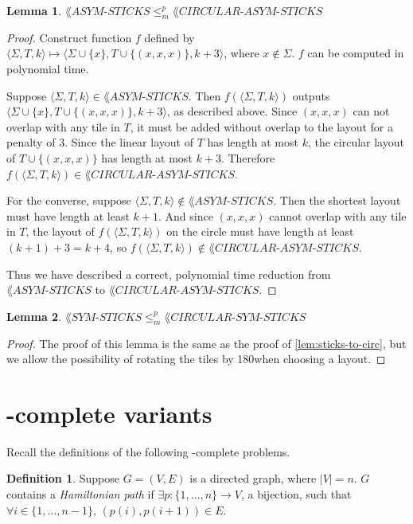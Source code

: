 \documentclass[draft]{article}
\newtheorem{lemma}[lemma]{Lemma}
\theoremstyle{definition} \newtheorem{definition}[definition]{Definition}
\theoremstyle{definition} \newreptheorem{definition}{Definition}
\newcommand{\dash}{\mbox{-}}
\newcommand{\defn}[1]{\emph{#1}}
\newcommand{\mor}{\leq_m^p}
\newcommand{\triple}[3]{\langle#1,#2,#3\rangle} %
\newcommand{\asticks}{ASYM\dash STICKS}
\newcommand{\sticks}{SYM\dash STICKS}
\newcommand{\acsticks}{CIRCULAR\dash ASYM\dash STICKS}
\newcommand{\csticks}{CIRCULAR\dash SYM\dash STICKS}
\begin{document}
  \begin{lemma}\label{lem:sticks-to-circ}
    $\lang{\asticks}\mor\lang{\acsticks}$
  \end{lemma}
  \begin{proof}
    Construct function $f$ defined by $\triple{\Sigma}{T}{k} \mapsto
    \triple{\Sigma\cup\{x\}}{T\cup\{(x,x,x)\}}{k+3}$, where
    $x\notin\Sigma$. $f$ can be computed in polynomial time.

    Suppose $\triple{\Sigma}{T}{k}\in\lang{\asticks}$. Then
    $f(\triple{\Sigma}{T}{k})$ outputs
    $\triple{\Sigma\cup\{x\}}{T\cup\{(x,x,x)\}}{k+3}$, as described
    above. Since $(x,x,x)$ can not overlap with any tile in $T$, it must be
    added without overlap to the layout for a penalty of $3$. Since the linear
    layout of $T$ has length at most $k$, the circular layout of
    $T\cup\{(x,x,x)\}$ has length at most $k+3$. Therefore
    $f(\triple{\Sigma}{T}{k})\in\lang{\acsticks}$.

    For the converse, suppose
    $\triple{\Sigma}{T}{k}\notin\lang{\asticks}$. Then the shortest layout must
    have length at least $k+1$. And since $(x, x, x)$ cannot overlap with any
    tile in $T$, the layout of $f(\triple{\Sigma}{T}{k})$ on the circle must
    have length at least $(k+1)+3=k+4$, so
    $f(\triple{\Sigma}{T}{k})\notin\lang{\acsticks}$.

    Thus we have described a correct, polynomial time reduction from
    $\lang{\asticks}$ to $\lang{\acsticks}$.
  \end{proof}

  \begin{lemma}
    $\lang{\sticks}\mor\lang{\csticks}$
  \end{lemma}
  \begin{proof}
    The proof of this lemma is the same as the proof of
    \autoref{lem:sticks-to-circ}, but we allow the possibility of rotating the
    tiles by 180\degree when choosing a layout.
  \end{proof}

  \section{\texorpdfstring{\NP}{NP}-complete variants}

  Recall the definitions of the following \NP-complete problems.

  \begin{definition}\label{def:hampath}
    Suppose $G=(V,E)$ is a directed graph, where $|V|=n$. $G$ contains a
    \defn{Hamiltonian path} if $\exists p\colon\{1,\ldots,n\}\to V$, a
    bijection, such that $\forall i\in\{1,\ldots,n-1\}$, $(p(i), p(i+1))\in E$.
  \end{definition}
\end{document}
